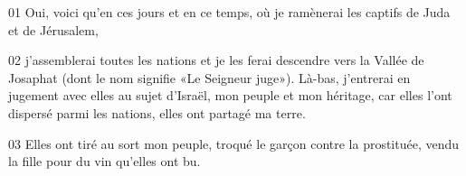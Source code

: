 01 Oui, voici qu’en ces jours et en ce temps, où je ramènerai les captifs de Juda et de Jérusalem,

02 j’assemblerai toutes les nations et je les ferai descendre vers la Vallée de Josaphat (dont le nom signifie «Le Seigneur juge»). Là-bas, j’entrerai en jugement avec elles au sujet d’Israël, mon peuple et mon héritage, car elles l’ont dispersé parmi les nations, elles ont partagé ma terre.

03 Elles ont tiré au sort mon peuple, troqué le garçon contre la prostituée, vendu la fille pour du vin qu’elles ont bu.
